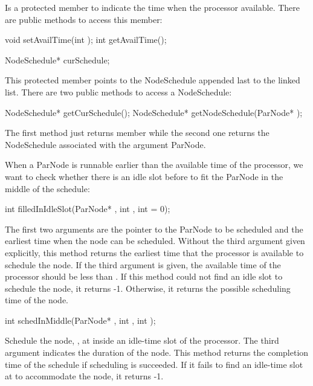 Is a protected member to indicate the time when the processor available.
There are public methods to access this member:

\begin{example}
void setAvailTime(int );
int getAvailTime();
\end{example}

\begin{example}
NodeSchedule* curSchedule;
\end{example}

This protected member points to the NodeSchedule appended last to the
linked list. There are two public methods to access a NodeSchedule:

\begin{example}
NodeSchedule* getCurSchedule();
NodeSchedule* getNodeSchedule(ParNode* );
\end{example}

The first method just returns  member while the second one
returns the NodeSchedule associated with the argument ParNode.

When a ParNode is runnable earlier than the available time of the processor,
we want to check whether there is an idle slot before  to
fit the ParNode in the middle of the schedule:

\begin{example}
int filledInIdleSlot(ParNode* , int , int  = 0);
\end{example}

The first two arguments are the pointer to the ParNode to be scheduled and
the earliest time when the node can be scheduled. Without the third argument
given explicitly, this method returns the earliest time that the processor
is available to schedule the node. If the third argument is given,
the available time of the processor should be less than .
If this method could not find an idle slot to schedule the node, it returns
-1. Otherwise, it returns the possible scheduling time of the node.

\begin{example}
int schedInMiddle(ParNode* , int , int );
\end{example}

Schedule the node, , at  inside an idle-time slot of the
processor. The third argument indicates the duration of the node.
This method returns the completion time of the schedule if scheduling
is succeeded. If it fails to find an idle-time slot at  to
accommodate the node, it returns -1.

